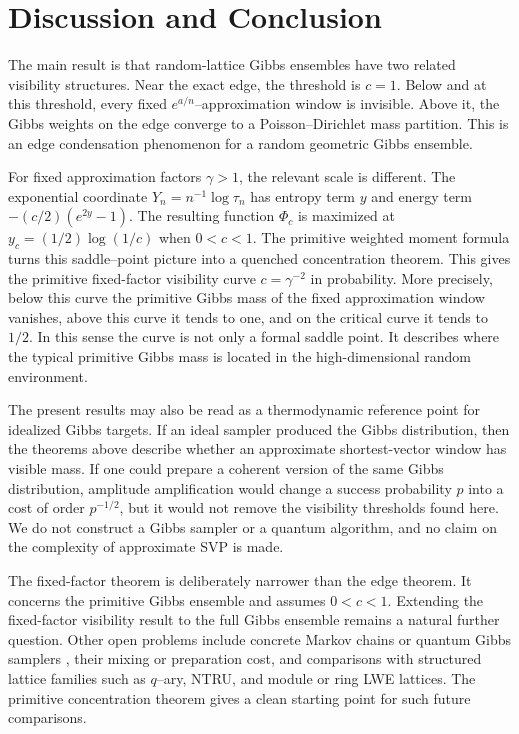 \documentclass[a4paper,12pt]{article}
\theoremstyle{definition}
\theoremstyle{remark}
\begin{document}
\section{Discussion and Conclusion}
\label{sec:discussion}

The main result is that random-lattice Gibbs ensembles have two related visibility structures.
Near the exact edge, the threshold is $c=1$.
Below and at this threshold, every fixed $e^{a/n}$--approximation window is invisible.
Above it, the Gibbs weights on the edge converge to a Poisson--Dirichlet mass partition.
This is an edge condensation phenomenon for a random geometric Gibbs ensemble.

For fixed approximation factors $\gamma>1$, the relevant scale is different.
The exponential coordinate $Y_n=n^{-1}\log\tau_n$ has entropy term $y$ and energy term $-(c/2)(e^{2y}-1)$.
The resulting function $\Phi_c$ is maximized at $y_c=(1/2)\log(1/c)$ when $0<c<1$.
The primitive weighted moment formula turns this saddle--point picture into a quenched concentration theorem.
This gives the primitive fixed-factor visibility curve $c=\gamma^{-2}$ in probability.
More precisely, below this curve the primitive Gibbs mass of the fixed approximation window vanishes, above this curve it tends to one, and on the critical curve it tends to $1/2$.
In this sense the curve is not only a formal saddle point.
It describes where the typical primitive Gibbs mass is located in the high-dimensional random environment.

The present results may also be read as a thermodynamic reference point for idealized Gibbs targets.
If an ideal sampler produced the Gibbs distribution, then the theorems above describe whether an approximate shortest-vector window has visible mass.
If one could prepare a coherent version of the same Gibbs distribution, amplitude amplification \cite{Grover96,Brassard02} would change a success probability $p$ into a cost of order $p^{-1/2}$, but it would not remove the visibility thresholds found here.
We do not construct a Gibbs sampler or a quantum algorithm, and no claim on the complexity of approximate SVP is made.

The fixed-factor theorem is deliberately narrower than the edge theorem.
It concerns the primitive Gibbs ensemble and assumes $0<c<1$.
Extending the fixed-factor visibility result to the full Gibbs ensemble remains a natural further question.
Other open problems include concrete Markov chains or quantum Gibbs samplers \cite{Temme11}, their mixing or preparation cost, and comparisons with structured lattice families such as $q$--ary, NTRU, and module or ring LWE lattices.
The primitive concentration theorem gives a clean starting point for such future comparisons.
\end{document}
